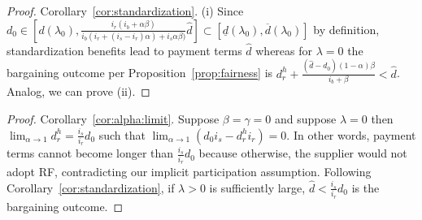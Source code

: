 \documentclass[a4paper,11pt]{article}
\newcommand{\dref}{\widehat d}
\newcommand{\dHyp}{d^h_r}
\renewcommand{\~}[1]{\tilde{#1}}
\renewcommand{\-}[1]{\overline{#1}}
\begin{document}
\begin{appendices}
\begin{proof}{Corollary~\ref{cor:standardization}.}
(i) Since $d_0\in\left[d\left(\lambda_0\right),\frac{ i_r (i_b + \alpha \beta)}{
  i_b (i_r + \left(i_s- i_r\right) \alpha) + i_s \alpha \beta)}\dref\right]\subset\left[\underline{d}\left(\lambda_0\right),\overline{d}\left(\lambda_0\right)\right]$ by definition, standardization benefits lead to payment terms $\dref$ whereas for $\lambda=0$ the bargaining outcome per Proposition~\ref{prop:fairness} is  $\dHyp + \frac{(\dref-d_0) (1 - \alpha) \beta}{i_b + \beta}<\dref$. Analog, we can prove (ii).
\end{proof}

\begin{proof}{Corollary~\ref{cor:alpha:limit}.}
Suppose $\beta=\gamma=0$ and suppose $\lambda=0$ then $\lim_{\alpha\rightarrow 1}d_r^h=\frac{i_s}{i_r}d_0$ such that $\lim_{\alpha\rightarrow 1}\left(d_0 i_s-d_r^h i_r\right)=0$. In other words, payment terms cannot become longer than $\frac{i_s}{i_r}d_0$ because otherwise, the supplier would not adopt RF, contradicting our implicit participation assumption. Following Corollary~\ref{cor:standardization}, if $\lambda>0$ is sufficiently large, $\dref<\frac{i_s}{i_r}d_0$ is the bargaining outcome. 
\end{proof}

\end{appendices}





\end{document}
